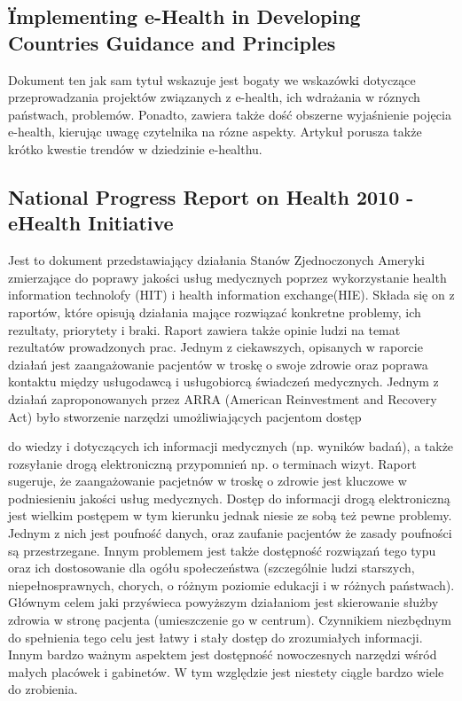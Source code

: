 \documentclass[a4paper,10pt]{article}
\begin{document}
\subsection{\" Implementing e-Health in Developing Countries Guidance and Principles}
Dokument ten jak sam tytuł wskazuje jest bogaty we wskazówki dotyczące przeprowadzania projektów związanych z e-health, ich wdrażania w róznych państwach, problemów. Ponadto, zawiera także 
dość obszerne wyjaśnienie pojęcia e-health, kierując uwagę czytelnika na rózne aspekty. Artykuł porusza także krótko kwestie trendów w dziedzinie e-healthu.

\subsection{National Progress Report on Health 2010 - eHealth Initiative}
Jest to dokument przedstawiający działania Stanów Zjednoczonych Ameryki zmierzające do poprawy jakości usług medycznych poprzez wykorzystanie health information technolofy (HIT) i health information exchange(HIE). Składa się on z raportów, które opisują działania mające rozwiązać konkretne problemy, ich rezultaty, priorytety i braki. Raport zawiera także opinie ludzi na temat 
rezultatów prowadzonych prac. Jednym z ciekawszych, opisanych w raporcie działań jest zaangażowanie pacjentów w troskę o swoje zdrowie oraz poprawa kontaktu między
usługodawcą i usługobiorcą świadczeń medycznych. Jednym z działań zaproponowanych przez  ARRA (American Reinvestment and Recovery Act) było stworzenie narzędzi umożliwiających pacjentom dostęp 

do wiedzy  i dotyczących ich informacji medycznych (np. wyników badań), a także rozsyłanie drogą elektroniczną przypomnień np. o terminach wizyt. Raport sugeruje, że zaangażowanie pacjetnów
w troskę o zdrowie jest kluczowe w podniesieniu jakości usług medycznych. Dostęp do informacji drogą elektroniczną jest wielkim postępem w tym kierunku jednak niesie ze sobą też pewne problemy.
Jednym z nich jest poufność danych, oraz zaufanie pacjentów że zasady poufności są przestrzegane. Innym problemem jest także dostępność rozwiązań tego typu oraz ich dostosowanie dla ogółu 
społeczeństwa (szczególnie ludzi starszych, niepełnosprawnych, chorych, o różnym poziomie edukacji i w różnych państwach).   
Głównym celem jaki przyświeca powyższym działaniom jest skierowanie służby zdrowia w stronę pacjenta (umieszczenie go w centrum). Czynnikiem niezbędnym do spełnienia tego celu  jest łatwy
i stały dostęp do zrozumiałych informacji. Innym bardzo ważnym aspektem jest dostępność  nowoczesnych narzędzi wśród małych placówek i gabinetów. W tym względzie jest niestety ciągle bardzo wiele do zrobienia.
\end{document}
